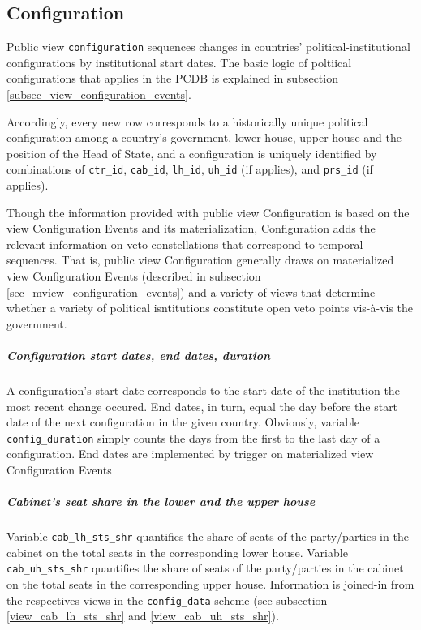 \subsection{Configuration}\label{subsec_pview_configuration}
Public view \texttt{\footnotesize configuration} sequences changes in countries' political-institutional configurations by institutional start dates. 
The basic logic of poltiical configurations that applies in the PCDB is explained in subsection \ref{subsec_view_configuration_events}.

Accordingly, every new row corresponds to a historically unique political configuration among a country's government, lower house, upper house and the position of the Head of State, and a configuration is uniquely identified by combinations of \texttt{\footnotesize ctr\_id}, \texttt{\footnotesize cab\_id}, \texttt{\footnotesize lh\_id}, \texttt{\footnotesize uh\_id} (if applies), and \texttt{\footnotesize prs\_id} (if applies).

Though the information provided with public view Configuration is based on the view Configuration Events and its materialization, Configuration adds the relevant information on veto constellations that correspond to temporal sequences.
That is, public view Configuration generally draws on materialized view Configuration Events (described in subsection \ref{sec_mview_configuration_events}) and a variety 
of views that determine whether a variety of political isntitutions constitute open veto points vis-\`a-vis the government. 

\subparagraph{Configuration start dates, end dates, duration}
A configuration's start date corresponds to the start date of the institution the most recent change occured. End dates, in turn, equal the day before the start date of the next configuration in the given country.
Obviously, variable \texttt{\footnotesize config\_duration} simply counts the days from the first to the last day of a configuration.
End dates are implemented by trigger on materialized view Configuration Events

\subparagraph{Cabinet's seat share in the lower and the upper house}
Variable \texttt{\footnotesize cab\_lh\_sts\_shr} quantifies the share of seats of the party/parties in the cabinet on the total seats in the corresponding lower house.
Variable \texttt{\footnotesize cab\_uh\_sts\_shr} quantifies the share of seats of the party/parties in the cabinet on the total seats in the corresponding upper house.
Information is joined-in from the respectives views in the \texttt{\footnotesize  config\_data} scheme (see subsection \ref{view_cab_lh_sts_shr} and \ref{view_cab_uh_sts_shr}).
 
